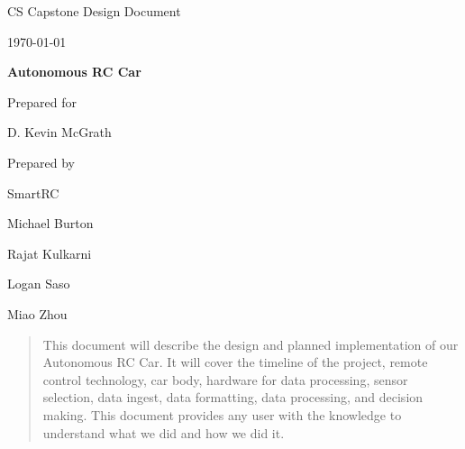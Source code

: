\documentclass[onecolumn, draftclsnofoot, 10pt, compsoc]{IEEEtran}
\def \CapstoneTeamName{Team 42}
\def \GroupMemberOne{			Michael Burton}
\def \GroupMemberTwo{			Rajat Kulkarni}
\def \GroupMemberThree{			Logan Saso}
\def \GroupMemberFour{			Miao Zhou}
\def \CapstoneProjectName{		Autonomous RC Car}
\def \CapstoneSponsorPerson{	D. Kevin McGrath}
\def \DocType{	%
				Design Document
				}
\newcommand{\NameSigPair}[1]{\par
\makebox[2.75in][r]{#1} \hfil 	\makebox[3.25in]{\makebox[2.25in]{\hrulefill} \hfill		\makebox[.75in]{\hrulefill}}
\par\vspace{-12pt} \textit{\tiny\noindent
\makebox[2.75in]{} \hfil		\makebox[3.25in]{\makebox[2.25in][r]{Signature} \hfill	\makebox[.75in][r]{Date}}}}
\renewcommand{\NameSigPair}[1]{#1}
\begin{document}
\begin{titlepage}
    \begin{singlespace}
        \hfill 
        \par\vspace{.2in}
        \centering
        \scshape{
            \huge CS Capstone \DocType \par
            {\large\today}\par
            \vspace{.5in}
            \textbf{\Huge\CapstoneProjectName}\par
            \vfill
            {\large Prepared for}\par
            \vspace{5pt}
            {\Large\NameSigPair{\CapstoneSponsorPerson}\par}
            {\large Prepared by }\par
            SmartRC\par
            \vspace{5pt}
            {\Large
                \NameSigPair{\GroupMemberOne}\par
                \NameSigPair{\GroupMemberTwo}\par
                \NameSigPair{\GroupMemberThree}\par
                \NameSigPair{\GroupMemberFour}\par
            }
            \vspace{20pt}
        }
        \begin{abstract}

            This document will describe the design and planned implementation of our Autonomous RC Car. It will cover the timeline of the project, remote control technology, car body, hardware for data processing, sensor selection, data ingest, data formatting, data processing, and decision making. This document provides any user with the knowledge to understand what we did and how we did it. 


        \end{abstract}     
    \end{singlespace}
\end{titlepage}
\newpage
{}
\tableofcontents
\end{document}
